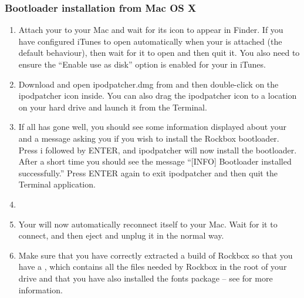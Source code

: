\subsubsection{Bootloader installation from Mac OS X}

\begin{enumerate}

\item Attach your \dap{} to your Mac and wait for its icon to appear in 
Finder. If you have configured iTunes to open automatically when your
\dap{} is attached (the default behaviour), then wait for it to open and
then quit it. You also need to ensure the ``Enable use as disk'' option
is enabled for your \dap{} in iTunes.

\item Download and open ipodpatcher.dmg from 
and then double-click on the ipodpatcher icon inside. You can also
drag the ipodpatcher icon to a location on your hard drive and launch
it from the Terminal.

\item If all has gone well, you should see some 
information displayed about your \dap{} and a message asking you if you 
wish to install the Rockbox bootloader. Press i followed by ENTER, and 
ipodpatcher will now install the bootloader. After a short time you 
should see the message ``[INFO] Bootloader installed successfully.'' Press 
ENTER again to exit ipodpatcher and then quit the Terminal application.

\item {}

\item Your \dap{} will now automatically reconnect itself to your Mac. 
Wait for it to connect, and then eject and unplug it in the normal way. 

\item Make sure that you have correctly extracted a build of Rockbox so that
you have a , which contains all the files needed by Rockbox
in the root of your \daps{} drive and that you have also installed the fonts
package -- see  for more information.

\end{enumerate}

